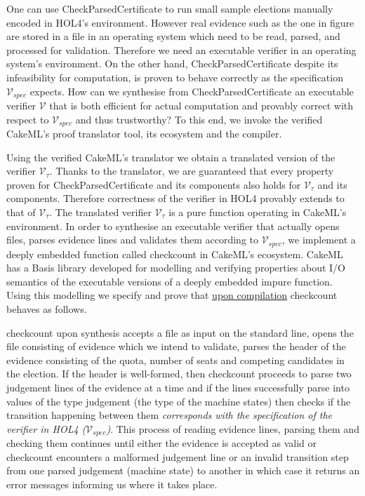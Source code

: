\documentclass[10pt,conference]{IEEEtran}
\begin{document}
One can use Check\textunderscore{}Parsed\textunderscore{}Certificate to run small sample elections manually encoded in HOL4's environment. However real evidence such as the one in figure are stored in a file in an operating system which need to be read, parsed, and processed for validation. Therefore we need an executable verifier in an operating system's environment. On the other hand, Check\textunderscore{}Parsed\textunderscore{}Certificate despite its infeasibility for computation, is proven to behave correctly as the specification $\mathcal{V}_{spec}$ expects. How can we synthesise from Check\textunderscore{}Parsed\textunderscore{}Certificate an executable verifier $\mathcal{V}$ that is both efficient for actual computation and provably correct with respect to $\mathcal{V}_{spec}$ and thus trustworthy? To this end, we invoke the verified CakeML's proof translator tool, its ecosystem and the compiler.

Using the verified CakeML's translator we obtain a translated version of the verifier $\mathcal{V}_{\tau}$. Thanks to the translator, we are guaranteed that every property proven for  
 Check\textunderscore{}Parsed\textunderscore{}Certificate and its components also holds for $\mathcal{V}_{\tau}$ and its components. Therefore correctness of the verifier in HOL4 provably extends to that of $\mathcal{V}_{\tau}$. The translated verifier $\mathcal{V}_{\tau}$ is a pure function operating in CakeML's environment. In order to synthesise an executable verifier that actually opens files, parses evidence lines and validates them according to $\mathcal{V}_{spec}$, we implement a deeply embedded function called check\textunderscore{}count in CakeML's ecosystem.  CakeML has a Basis library developed for modelling and verifying properties about I/O semantics of the executable versions  of a deeply embedded impure function.  Using this modelling we specify and prove that \underline{upon compilation} check\textunderscore{}count behaves as follows. 
 
 check\textunderscore{}count upon synthesis accepts a file as input on the standard line, opens the file consisting of  evidence which we intend to validate, parses the header of the evidence consisting of the quota, number of seats and competing candidates in the election. If the header is well-formed, then check\textunderscore{}count proceeds to parse two judgement lines of the evidence at a time and if the lines  successfully parse into  values of the type judgement (the type of the machine states) then checks if  the transition happening between them \emph{corresponds with the specification of the verifier in HOL4 ($\mathcal{V}_{spec}$)}. This process of reading evidence lines, parsing them and checking them continues until either the evidence is accepted as valid or  check\textunderscore{}count encounters a malformed judgement line or an invalid transition step from one parsed judgement (machine state) to another  in which case it returns an error messages  informing us where it takes place.  
 
\end{document}
